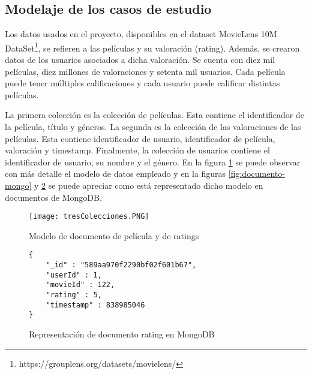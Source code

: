 \documentclass[conference,compsoc]{sty/IEEEtran}
\begin{document}
\subsection{Modelaje de los casos de estudio}
Los datos usados en el proyecto, disponibles en el dataset MovieLens 10M DataSet\footnote{https://grouplens.org/datasets/movielens/}, se refieren a las películas y su valoración (rating). Además, se crearon datos de los usuarios asociados a dicha valoración. Se cuenta con  diez mil películas, diez millones de valoraciones y setenta mil usuarios. Cada película puede tener múltiples calificaciones y cada usuario puede calificar distintas películas.

 La primera colección es la colección de películas. Esta contiene el identificador de la película, título y géneros. La segunda es la colección de las valoraciones de las películas. Esta contiene identificador de usuario, identificador de película, valoración y timestamp. Finalmente, la colección de usuarios contiene el identificador de usuario, su nombre y el género. En la figura \ref{fig:pelicula-rating} se puede observar con más detalle el modelo de datos empleado y en la figuras \ref{fig:documento-mongo} y \ref{fig:rating-documento} se puede apreciar como está representado dicho modelo en documentos de MongoDB.


\begin{figure}
\begin{center}
\texttt{[image: tresColecciones.PNG]}
\end{center}
\caption{Modelo de documento de película y de ratings} 
\label{fig:pelicula-rating}
\end{figure}

\begin{figure}
    \begin{verbatim}
{
	"_id" : "589aa970f2290bf02f601b67",
	"userId" : 1,
	"movieId" : 122,
	"rating" : 5,
	"timestamp" : 838985046
}

\end{verbatim}
\caption{Representación de documento rating en MongoDB} 
\label{fig:rating-documento}
\end{figure}
\end{document}
